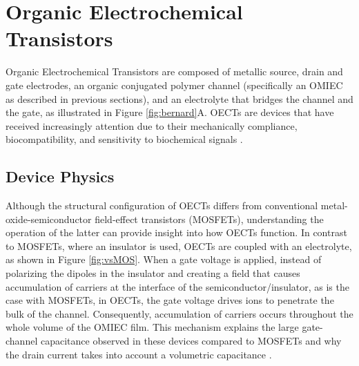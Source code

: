 
\section{Organic Electrochemical Transistors} \label{sec:OECTs}

Organic Electrochemical Transistors are composed of metallic source, drain and gate electrodes, an organic conjugated polymer channel (specifically an OMIEC as described in previous sections), and an electrolyte that bridges the channel and the gate, as illustrated in Figure \ref{fig:bernard}A. OECTs are devices that have received increasingly attention due to their mechanically compliance, biocompatibility, and sensitivity to biochemical signals \cite{tanMixedIonicElectronic2022}. 



\subsection{Device Physics} \label{subsec:devphy}

Although the structural configuration of OECTs differs from conventional metal-oxide-semiconductor field-effect transistors (MOSFETs), understanding the operation of the latter can provide insight into how OECTs function. In contrast to MOSFETs, where an insulator is used, OECTs are coupled with an electrolyte, as shown in Figure \ref{fig:vsMOS}. When a gate voltage is applied, instead of polarizing the dipoles in the insulator and creating a field that causes accumulation of carriers at the interface of the semiconductor/insulator, as is the case with MOSFETs, in OECTs, the gate voltage drives ions to penetrate the bulk of the channel. Consequently, accumulation of carriers occurs throughout the whole volume of the OMIEC film. This mechanism explains the large gate-channel capacitance observed in these devices compared to MOSFETs and why the drain current takes into account a volumetric capacitance \cite{friedleinDevicePhysicsOrganic2018}.


